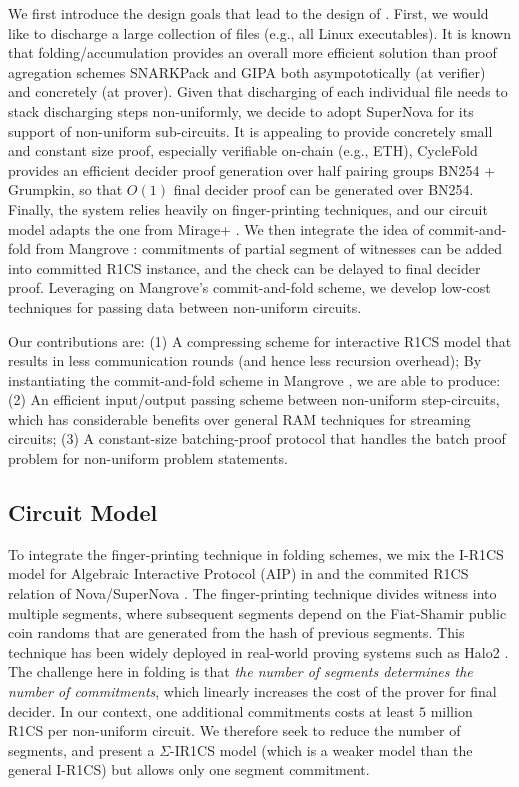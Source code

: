 We first introduce the design goals that lead to the design
of \foldpot.  First, we would like to discharge a 
large collection of files (e.g., all Linux
executables). It is known that folding/accumulation 
provides an overall more efficient solution
than proof agregation schemes SNARKPack \cite{SNARKPack} 
and GIPA \cite{Bunz21} both asympototically (at verifier) and
concretely (at prover). Given that discharging of each individual file
needs to stack discharging steps non-uniformly,
we decide to adopt SuperNova \cite{SuperNova} for its 
support of non-uniform sub-circuits. It is appealing to provide
concretely small and constant size proof, especially verifiable
on-chain (e.g., ETH), CycleFold \cite{CycleFold} provides
an efficient decider proof generation over half pairing groups
BN254 + Grumpkin, so that $O(1)$ final decider proof can be
generated over BN254.
Finally, the system relies heavily on finger-printing techniques,
and our circuit model adapts the one from Mirage+ \cite{AIPRam}.
We then integrate the idea of commit-and-fold from 
Mangrove \cite{Mangrove}: commitments of partial segment of
witnesses can be added into committed R1CS instance, and the check
can be delayed to final decider proof. Leveraging on Mangrove's
commit-and-fold scheme, we develop low-cost techniques for
passing data between non-uniform circuits.

Our contributions are: (1) A compressing scheme for interactive R1CS
model \cite{AIPRam} that results in less communication rounds (and hence
less recursion overhead); By instantiating the commit-and-fold
scheme in Mangrove \cite{Mangrove}, we are able to produce: 
(2) An efficient input/output passing scheme
between non-uniform step-circuits, which has considerable benefits
over general RAM techniques for streaming circuits; (3) 
A constant-size batching-proof protocol that handles the batch
proof problem for non-uniform problem statements. 

\subsection{Circuit Model}
To integrate the finger-printing technique in folding schemes,
we mix the I-R1CS model for Algebraic Interactive Protocol (AIP)
in \cite{AIPRam} and the commited R1CS relation of Nova/SuperNova
\cite{Nova}. The 
finger-printing technique divides witness into multiple segments, where
subsequent segments depend on the Fiat-Shamir public coin 
randoms that are generated from the hash of previous segments.
This technique has been widely deployed in real-world proving
systems such as Halo2 \cite{Halo2}.
The challenge here in folding
is that {\em the number of segments determines the number of
commitments}, which linearly increases the cost of the prover
for final decider. In our context,
one additional commitments costs at least
$5$ million R1CS per non-uniform circuit.
We therefore seek to reduce the number of segments,
and present a $\Sigma$-IR1CS model (which is a weaker model
than the general I-R1CS) but allows only one segment commitment.


